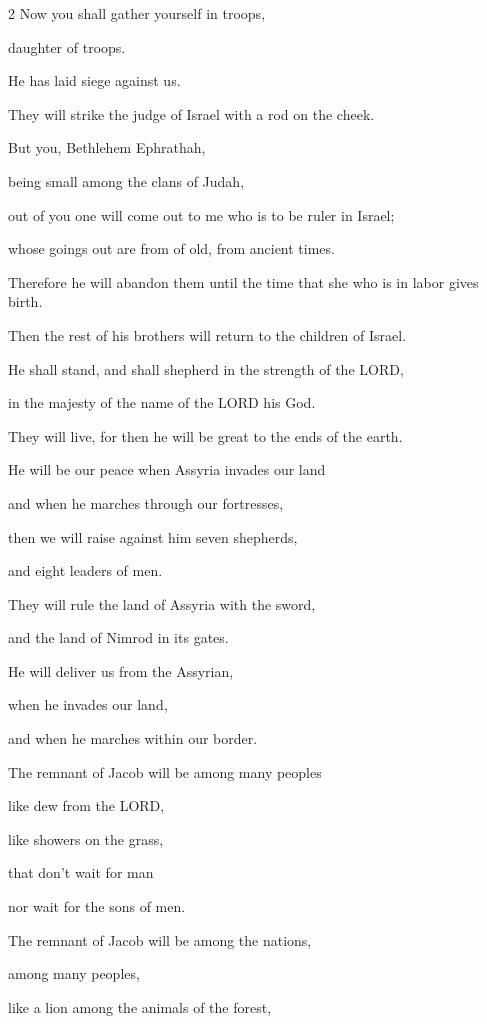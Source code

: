 \begin{multicols}{2}
\mychapter{} \myverse*{}Now you shall gather yourself in troops,

daughter of troops.

He has laid siege against us.

They will strike the judge of Israel with a rod on the cheek.

\myverse{}But you, Bethlehem Ephrathah,

being small among the clans of Judah,

out of you one will come out to me who is to be ruler in Israel;

whose goings out are from of old, from ancient times.

\myverse{}Therefore he will abandon them until the time that she who is
in labor gives birth.

Then the rest of his brothers will return to the children of Israel.

\myverse{}He shall stand, and shall shepherd in the strength of the LORD,

in the majesty of the name of the LORD his God.

They will live, for then he will be great to the ends of the earth.

\myverse{}He will be our peace when Assyria invades our land

and when he marches through our fortresses,

then we will raise against him seven shepherds,

and eight leaders of men.

\myverse{}They will rule the land of Assyria with the sword,

and the land of Nimrod in its gates.

He will deliver us from the Assyrian,

when he invades our land,

and when he marches within our border.

\myverse{}The remnant of Jacob will be among many peoples

like dew from the LORD,

like showers on the grass,

that don’t wait for man

nor wait for the sons of men.

\myverse{}The remnant of Jacob will be among the nations,

among many peoples,

like a lion among the animals of the forest,


\end{multicols}
